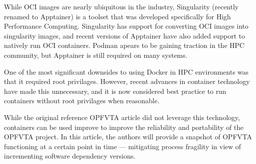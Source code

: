 While OCI images are nearly ubiquitous in the industry, Singularity (recently renamed to Apptainer) is a toolset that was developed specifically for High Performance Computing.
Singularity has support for converting OCI images into singularity images, and recent versions of Apptainer have also added support to natively run OCI containers.
Podman apears to be gaining traction in the HPC community, but Apptainer is still required on many systems.

One of the most significant downsides to using Docker in HPC environments was that it required root privilages.
However, recent advances in container technology have made this unnecessary, and it is now considered best practice to run containers without root privilages when reasonable.

While the original reference OPFVTA article did not leverage this technology, containers can be used improve to improve the reliability and portability of the OPFVTA project.
In this article, the authors will provide a snapshot of OPFVTA functioning at a certain point in time — mitigating process fragility in view of incrementing software dependency versions.

